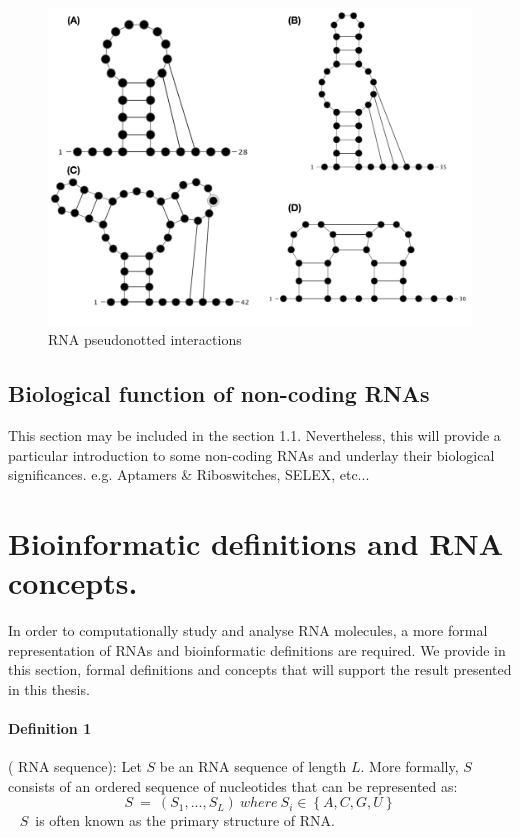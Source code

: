 \begin{figure}
	\includegraphics[width=1.0 \linewidth]{../res/images/arnaque/pk_type}
	\caption{RNA pseudonotted interactions}
\end{figure}

\subsection{Biological function of non-coding RNAs}\label{sec:custom}

This section may be included in the section 1.1.  Nevertheless, this will provide a particular introduction to some non-coding RNAs and underlay their biological significances. e.g. Aptamers \& Riboswitches, SELEX, etc...

\section{Bioinformatic definitions and RNA concepts.}
In order to computationally study and analyse RNA molecules, a more formal representation of RNAs and bioinformatic definitions are required. We provide in this section, formal definitions and concepts that will support the result presented in this thesis.

\paragraph{\textbf{Definition 1}} ( RNA sequence): Let $S$ be an RNA sequence of length $L$.  More formally, $S$ consists of an ordered sequence of nucleotides that can be represented as:~ \[S\ =\ \left(S_1,...,S_L\right)\ where\ S_i\in\left\{A,C,G,U\right\}\]~
\(S\)~is often known as the primary structure of RNA.

